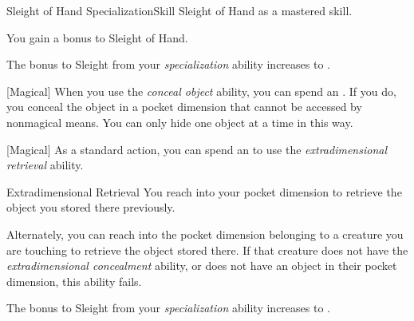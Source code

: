     \begin{feat}{Sleight of Hand Specialization}{Skill}
        \featpre Sleight of Hand as a mastered skill.

        \ff{}

         You gain a  bonus to Sleight of Hand.

         The bonus to Sleight from your \textit{specialization} ability increases to .

        [Magical] When you use the \textit{conceal object} ability, you can spend an .
        If you do, you conceal the object in a pocket dimension that cannot be accessed by nonmagical means.
        You can only hide one object at a time in this way.

        [Magical] As a standard action, you can spend an  to use the \textit{extradimensional retrieval} ability.
        \begin{ability}{Extradimensional Retrieval}
            You reach into your pocket dimension to retrieve the object you stored there previously.

            Alternately, you can reach into the pocket dimension belonging to a creature you are touching to retrieve the object stored there.
            If that creature does not have the \textit{extradimensional concealment} ability, or does not have an object in their pocket dimension, this ability fails.
        \end{ability}

         The bonus to Sleight from your \textit{specialization} ability increases to .
    \end{feat}

